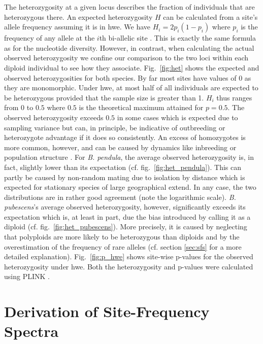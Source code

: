 \documentclass[hidelinks,11pt]{article}
\newcommand{\pendula}{\textit{B. pendula}}
\newcommand{\pubescens}{\textit{B. pubescens}}
\begin{document}
{    The heterozygosity at a given locus describes the fraction of individuals that are heterozygous there. An expected heterozygosity $H$ can be calculated from a site's allele frequency assuming it is in \acrfull{hwe}. We have $H_i = 2p_i(1-p_i)$ where $p_i$ is the frequency of any allele at the $i$th bi-allelic site \cite{gillespie}. This is exactly the same formula as for the nucleotide diversity. However, in contrast, when calculating the actual observed heterozygosity we confine our comparison to the two loci within each diploid individual to see how they associate. Fig.~\ref{fig:het} shows the expected and observed heterozygosities for both species. By far most sites have values of $0$ as they are monomorphic. Under \acrshort{hwe}, at most half of all individuals are expected to be heterozygous provided that the sample size is greater than 1. $H_i$ thus ranges from $0$ to $0.5$ where $0.5$ is the theoretical maximum attained for $p = 0.5$. The observed heterozygosity exceeds $0.5$ in some cases which is expected due to sampling variance but can, in principle, be indicative of outbreeding or heterozygote advantage if it does so consistently. An excess of homozygotes is more common, however, and can be caused by dynamics like inbreeding or population structure \cite{gillespie}. For \pendula{}, the average observed heterozygosity is, in fact, slightly lower than its expectation (cf. fig.~\ref{fig:het_pendula}). This can partly be caused by non-random mating due to isolation by distance which is expected for stationary species of large geographical extend. In any case, the two distributions are in rather good agreement (note the logarithmic scale). \pubescens{}'s average observed heterozygosity, however, significantly exceeds its expectation which is, at least in part, due the bias introduced by calling it as a diploid (cf. fig.~\ref{fig:het_pubescens}). More precisely, it is caused by neglecting that polyploids are more likely to be heterozygous than diploids and by the overestimation of the frequency of rare alleles (cf. section \ref{sec:sfs} for a more detailed explanation). Fig.~\ref{fig:p_hwe} shows site-wise p-values for the observed heterozygosity under \acrlong{hwe}. Both the heterozygosity and p-values were calculated using PLINK \cite{plink, hwe-plink}.

    \clearpage


    \section{Derivation of Site-Frequency Spectra}
    \label{sec:sfs-derivation}

}
\end{document}
